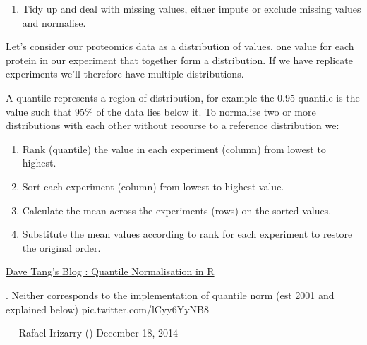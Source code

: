 \documentclass[12pt,]{book}
\providecommand{\tightlist}{%
  \setlength{\itemsep}{0pt}\setlength{\parskip}{0pt}}
\theoremstyle{definition}
\theoremstyle{definition}
\theoremstyle{definition}
\theoremstyle{remark}
\begin{document}
\begin{enumerate}
\def\labelenumi{\arabic{enumi}.}
\setcounter{enumi}{1}
\tightlist
\item
  Tidy up and deal with missing values, either impute or exclude missing
  values and normalise.
\end{enumerate}

Let's consider our proteomics data as a distribution of values, one
value for each protein in our experiment that together form a
distribution. If we have replicate experiments we'll therefore have
multiple distributions.

A quantile represents a region of distribution, for example the 0.95
quantile is the value such that 95\% of the data lies below it. To
normalise two or more distributions with each other without recourse to
a reference distribution we:

\begin{enumerate}
\def\labelenumi{(\roman{enumi})}
\tightlist
\item
  Rank (quantile) the value in each experiment (column) from lowest to
  highest.
\item
  Sort each experiment (column) from lowest to highest value.
\item
  Calculate the mean across the experiments (rows) on the sorted values.
\item
  Substitute the mean values according to rank for each experiment to
  restore the original order.
\end{enumerate}

\href{https://davetang.org/muse/2014/07/07/quantile-normalisation-in-r/}{Dave
Tang's Blog : Quantile Normalisation in R}

.\citet{ewanbirney} Neither corresponds to the \citet{Bioconductor}
implementation of quantile norm (est 2001 and explained below)
pic.twitter.com/lCyy6YyNB8

--- Rafael Irizarry (\citet{rafalab}) December 18, 2014
\end{document}
